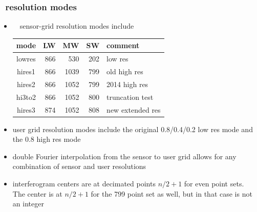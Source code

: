 \documentclass[11pt]{beamer}
\begin{document}
\begin{frame}
\frametitle{\ccast\ resolution modes}

\begin{itemize}

  \item \umbc\ \ccast\ sensor-grid resolution modes include

\begin{tabular}{crrrl}
   mode  &  LW  &   MW  &  SW  &  comment  \\
   \hline
  lowres &  866 &   530 &  202 &  low res  \\
  hires1 &  866 &  1039 &  799 &  old high res  \\
  hires2 &  866 &  1052 &  799 &  2014 high res  \\
  hi3to2 &  866 &  1052 &  800 &  truncation test  \\
  hires3 &  874 &  1052 &  808 &  new extended res  \\
\end{tabular}

  \item {\ccast} user grid resolution modes include the original
    0.8/0.4/0.2 {\wn} {\opd} low res mode and the 0.8 {\wn}
    {\opd} high res mode

  \item double Fourier interpolation from the sensor to user grid
    allows for any combination of sensor and user resolutions

  \item interferogram centers are at decimated points $n/2 + 1$
    for even point sets.  The center is at $n/2 + 1$ for the 799
    point set as well, but in that case is not an integer

\end{itemize}

\end{frame}
\end{document}
